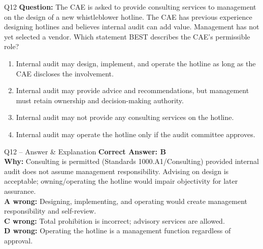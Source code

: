 \documentclass[aspectratio=169,10pt]{beamer}
\begin{document}
	\begin{frame}[t]{Q12}
		\small
		\textbf{Question:} The CAE is asked to provide consulting services to management on the design of a new whistleblower hotline. The CAE has previous experience designing hotlines and believes internal audit can add value. Management has not yet selected a vendor. Which statement BEST describes the CAE's permissible role?
		\begin{enumerate}[label=\Alph*.,itemsep=1pt,topsep=2pt]
			\item Internal audit may design, implement, and operate the hotline as long as the CAE discloses the involvement.
			\item Internal audit may provide advice and recommendations, but management must retain ownership and decision-making authority.
			\item Internal audit may not provide any consulting services on the hotline.
			\item Internal audit may operate the hotline only if the audit committee approves.
		\end{enumerate}
	\end{frame}
	
	\begin{frame}[t]{Q12 -- Answer \& Explanation}
		\small
		\textbf{Correct Answer: B} \\[4pt]
		\textbf{Why:} Consulting is permitted (Standards 1000.A1/Consulting) provided internal audit does not assume management responsibility. Advising on design is acceptable; owning/operating the hotline would impair objectivity for later assurance. \\[4pt]
		\textbf{A wrong:} Designing, implementing, and operating would create management responsibility and self-review. \\[2pt]
		\textbf{C wrong:} Total prohibition is incorrect; advisory services are allowed. \\[2pt]
		\textbf{D wrong:} Operating the hotline is a management function regardless of approval.
	\end{frame}
	
\end{document}
